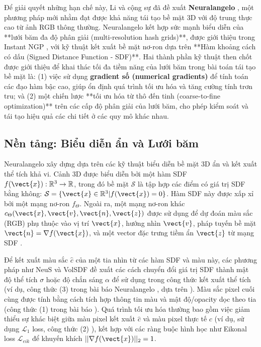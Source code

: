 Để giải quyết những hạn chế này, Li và cộng sự đã đề xuất \textbf{Neuralangelo} \cite{Li23Neuralangelo}, một phương pháp mới nhằm đạt được khả năng tái tạo bề mặt 3D với độ trung thực cao từ ảnh RGB thông thường. Neuralangelo kết hợp sức mạnh biểu diễn của **lưới băm đa độ phân giải (multi-resolution hash grids)**, được giới thiệu trong Instant NGP \cite{Muller22InstantNGP}, với kỹ thuật kết xuất bề mặt nơ-ron dựa trên **Hàm khoảng cách có dấu (Signed Distance Function - SDF)**. Hai thành phần kỹ thuật then chốt được giới thiệu để khai thác tối đa tiềm năng của lưới băm trong bài toán tái tạo bề mặt là: (1) việc sử dụng \textbf{gradient số (numerical gradients)} để tính toán các đạo hàm bậc cao, giúp ổn định quá trình tối ưu hóa và tăng cường tính trơn tru; và (2) một chiến lược **tối ưu hóa từ thô đến tinh (coarse-to-fine optimization)** trên các cấp độ phân giải của lưới băm, cho phép kiểm soát và tái tạo hiệu quả các chi tiết ở các quy mô khác nhau.

\subsection{Nền tảng: Biểu diễn ẩn và Lưới băm}
\label{subsec:neuralangelo_background}

Neuralangelo xây dựng dựa trên các kỹ thuật biểu diễn bề mặt 3D ẩn và kết xuất thể tích khả vi. Cảnh 3D được biểu diễn bởi một hàm SDF $f(\vect{x}): \mathbb{R}^3 \rightarrow \mathbb{R}$, trong đó bề mặt $\mathcal{S}$ là tập hợp các điểm có giá trị SDF bằng không: $\mathcal{S} = \{\vect{x} \in \mathbb{R}^3 | f(\vect{x}) = 0\}$. Hàm SDF này được xấp xỉ bởi một mạng nơ-ron $f_\Theta$. Ngoài ra, một mạng nơ-ron khác $c_\Theta(\vect{x}, \vect{v}, \vect{n}, \vect{z})$ được sử dụng để dự đoán màu sắc (RGB) phụ thuộc vào vị trí $\vect{x}$, hướng nhìn $\vect{v}$, pháp tuyến bề mặt $\vect{n} = \nabla f(\vect{x})$, và một vector đặc trưng tiềm ẩn $\vect{z}$ từ mạng SDF \cite{Yariv20IDR}.

Để kết xuất màu sắc $\hat{c}$ của một tia nhìn từ các hàm SDF và màu này, các phương pháp như NeuS \cite{Wang21NeuS} và VolSDF \cite{Yariv21VolSDF} đề xuất các cách chuyển đổi giá trị SDF thành mật độ thể tích $\sigma$ hoặc độ chắn sáng $\alpha$ để sử dụng trong công thức kết xuất thể tích (ví dụ, công thức (3) trong bài báo Neuralangelo \cite{Li23Neuralangelo}, dựa trên \cite{Wang21NeuS}). Màu sắc pixel cuối cùng được tính bằng cách tích hợp thông tin màu và mật độ/opacity dọc theo tia (công thức (1) trong bài báo \cite{Li23Neuralangelo}). Quá trình tối ưu hóa thường bao gồm việc giảm thiểu sự khác biệt giữa màu pixel kết xuất $\hat{c}$ và màu pixel thực tế $c$ (ví dụ, sử dụng $\mathcal{L}_1$ loss, công thức (2) \cite{Li23Neuralangelo}), kết hợp với các ràng buộc hình học như Eikonal loss $\mathcal{L}_{eik}$ để khuyến khích $||\nabla f(\vect{x})||_2 = 1$.

